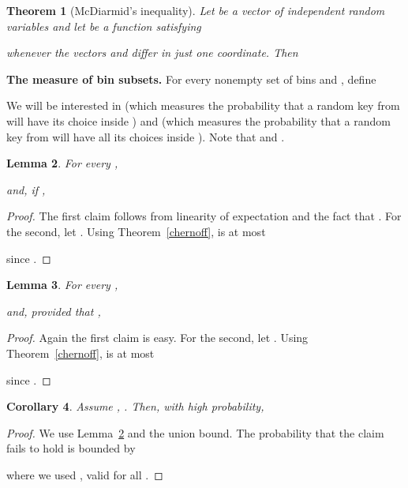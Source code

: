 \documentclass[10pt,conference,letterpaper]{IEEEtran}
\newcommand{\spara}[1]{\smallskip\noindent\textbf{#1}}
\newcommand{\mycomment}[1]{}
\newtheorem{theorem}{Theorem}[section]
\newtheorem{lemma}[theorem]{Lemma}
\newtheorem{corollary}[theorem]{Corollary}
\begin{document}
\begin{theorem}[McDiarmid's inequality]\label{bounded_dif}
Let  be a vector of independent random variables and let  be a function satisfying
    
whenever the vectors  and  differ in just one coordinate. Then

\end{theorem}

\spara{The  measure of bin subsets.}
For every nonempty set of bins  and , define

We will be  interested in  (which measures the probability that a random key from  will have its choice inside ) and 
(which measures the probability that a random key from  will have all its choices inside ).
Note that  and .

\begin{lemma}\label{lem:mu1}
For every ,
     
and, if ,
       
\end{lemma}
\begin{proof}
The first claim follows from linearity of expectation and the fact that .
For the second, let . Using Theorem~\ref{chernoff},
 is at most
    

since .
\end{proof}

\mycomment{
    \begin{corollary}
    With high probability, for all  it holds that
    
    \end{corollary}
    \begin{proof}
    Since , it suffices to show the claim when .
    This follows from Lemma~\ref{lem:mu1} by setting , , and applying the union bound.
    \end{proof}
}

\begin{lemma}\label{lem:mu2}
For every ,
     
and, provided that ,
       
\end{lemma}
\begin{proof}
Again the first claim is easy. For the second, let . Using Theorem~\ref{chernoff},
 is at most
    
    
since .
\end{proof}

\begin{corollary}\label{coro:mu2}
Assume , .  Then, with high probability, 
       
\end{corollary}
\begin{proof}
We use Lemma~\ref{lem:mu1} and the union bound. The probability that the claim fails to hold is bounded by
                                                                  
where we used  , valid for all .
\end{proof}
\end{document}
